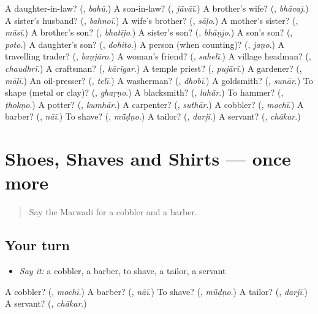 \begin{tcolorbox}[breakable,colback=teal!4,colframe=teal!35!black,title={Before you move on}]
A daughter-in-law? (\textbf{}, \emph{bahū}.) A son-in-law? (\textbf{}, \emph{jãvāī}.) A brother's wife? (\textbf{}, \emph{bhāvaj}.) A sister's husband? (\textbf{}, \emph{bahnoī}.) A wife's brother? (\textbf{}, \emph{sāḷo}.) A mother's sister? (\textbf{}, \emph{māsī}.) A brother's son? (\textbf{}, \emph{bhatījo}.) A sister's son? (\textbf{}, \emph{bhāṇjo}.) A son's son? (\textbf{}, \emph{poto}.) A daughter's son? (\textbf{}, \emph{dohito}.) A person (when counting)? (\textbf{}, \emph{jaṇo}.) A travelling trader? (\textbf{}, \emph{baṇjāro}.) A woman's friend? (\textbf{}, \emph{sahelī}.) A village headman? (\textbf{}, \emph{chaudhrī}.) A craftsman? (\textbf{}, \emph{kārīgar}.) A temple priest? (\textbf{}, \emph{pujārī}.) A gardener? (\textbf{}, \emph{māḷī}.) An oil-presser? (\textbf{}, \emph{telī}.) A washerman? (\textbf{}, \emph{dhobī}.) A goldsmith? (\textbf{}, \emph{sunār}.) To shape (metal or clay)? (\textbf{}, \emph{ghaṛṇo}.) A blacksmith? (\textbf{}, \emph{luhār}.) To hammer? (\textbf{}, \emph{ṭhokṇo}.) A potter? (\textbf{}, \emph{kumhār}.) A carpenter? (\textbf{}, \emph{suthār}.) A cobbler? (\textbf{}, \emph{mochī}.) A barber? (\textbf{}, \emph{nāī}.) To shave? (\textbf{}, \emph{mū̃ḍṇo}.) A tailor? (\textbf{}, \emph{darjī}.) A servant? (\textbf{}, \emph{chākar}.)
\end{tcolorbox}
\section[(dialogue)]{Shoes, Shaves and Shirts — once more}

\label{lesson:MW-R265-review-final-265}



\begin{quote}
Say the Marwadi for a cobbler and a barber.
\end{quote}

\subsection*{Your turn}
\begin{itemize}
\raggedright
  \item \emph{Say it:} a cobbler, a barber, to shave, a tailor, a servant
\end{itemize}

\begin{tcolorbox}[breakable,colback=teal!4,colframe=teal!35!black,title={Before you move on}]
A cobbler? (\textbf{}, \emph{mochī}.) A barber? (\textbf{}, \emph{nāī}.) To shave? (\textbf{}, \emph{mū̃ḍṇo}.) A tailor? (\textbf{}, \emph{darjī}.) A servant? (\textbf{}, \emph{chākar}.)
\end{tcolorbox}
